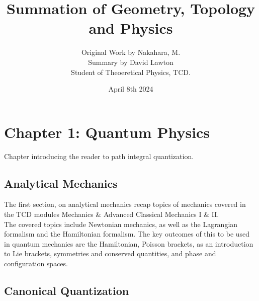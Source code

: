 \documentclass{article}
\title{Summation of Geometry, Topology and Physics}
\author{Original Work by Nakahara, M.\\Summary by David Lawton\\ Student of Theoeretical Physics, TCD.}
\date{April 8th 2024}
\begin{document}
\maketitle
\vfill
\tableofcontents

\newpage

\section{Chapter 1: Quantum Physics}
Chapter introducing the reader to path integral quantization.
\subsection{Analytical Mechanics}
The first section, on analytical mechanics recap topics of mechanics covered in the TCD modules Mechanics \& Advanced Classical Mechanics I \& II.\\
\indent The covered topics include Newtonian mechanics, as well as the Lagrangian formalism and the Hamiltonian formalism. The key outcomes of this to be used in quantum mechanics are the Hamiltonian, Poisson brackets, as an introduction to Lie brackets, symmetries and conserved quantities, and phase and configuration spaces.
\subsection{Canonical Quantization}
\end{document}
